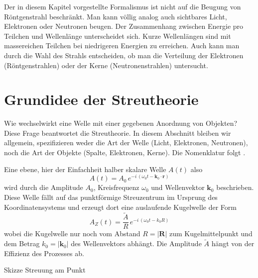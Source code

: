 Der in diesem Kapitel vorgestellte Formalismus ist nicht auf die Beugung von Röntgenstrahl beschränkt. Man kann völlig analog auch sichtbares Licht, Elektronen oder Neutronen beugen. Der Zusammenhang zwischen Energie pro Teilchen und Wellenlänge unterscheidet sich. Kurze Wellenlängen sind mit massereichen Teilchen bei niedrigeren Energien zu erreichen.  Auch kann man durch die Wahl des Strahls entscheiden, ob man die Verteilung der Elektronen (Röntgenstrahlen) oder der Kerne (Neutronenstrahlen) untersucht. 


\section{Grundidee der Streutheorie}

Wie wechselwirkt eine Welle mit einer gegebenen Anordnung von Objekten? Diese Frage beantwortet die Streutheorie. In diesem Abschnitt bleiben wir allgemein, spezifizieren weder die Art der Welle (Licht, Elektronen, Neutronen), noch die Art der Objekte (Spalte, Elektronen, Kerne). Die Nomenklatur folgt \cite{Hunklinger2014}.

Eine ebene, hier der Einfachheit halber skalare Welle $A(t)$ also
\begin{equation}
 A(t) = A_0 \, e^{- i \, (\omega_0 t - \mathbf{k}_0 \cdot \mathbf{r})}
\end{equation}
wird durch die Amplitude $A_0$, Kreisfrequenz $\omega_0$ und Wellenvektor $\mathbf{k}_0$ beschrieben. Diese Welle fällt auf das punktförmige Streuzentrum im Ursprung des Koordinatensystems und erzeugt dort eine auslaufende Kugelwelle der Form
\begin{equation}
 A_Z(t) = \frac{\tilde{A}}{R} \,  e^{- i \, (\omega_0 t - k_0 R)}
\end{equation}
wobei  die Kugelwelle nur noch vom Abstand $R = |\mathbf{R}|$ zum Kugelmittelpunkt und dem Betrag $k_0 = | \mathbf{k}_0| $ des Wellenvektors abhängt. Die Amplitude $\tilde{A}$ hängt von der Effizienz des Prozesses ab.

\begin{marginfigure}
\caption{Skizze Streuung am Punkt}
\end{marginfigure}




